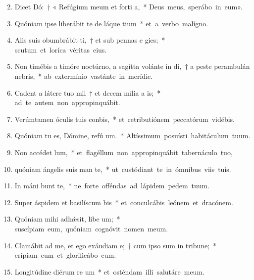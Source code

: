 \begin{flushleft}
\begin{enumerate}[leftmargin=*]
\setcounter{enumi}{1}
\item Dicet Dó:~† « Refúgium meum et forti a,~* \mbox{Deus meus, sperábo in eum».}

\item Quóniam ipse liberábit te de láque tium~* \mbox{et a verbo malígno.}

\item Alis suis obumbrábit ti,~† et sub pennas e gies;~* \mbox{scutum et loríca véritas eius.}

\item Non timébis a timóre noctúrno, a sagítta volánte in di,~† a peste perambulán  nebris,~* \mbox{ab extermínio vastánte in merídie.}

\item Cadent a látere tuo mil~† et decem mília a  is;~* \mbox{ad te autem non appropinquábit.}

\item Verúmtamen óculis tuis conbis,~* \mbox{et retributiónem peccatórum vidébis.}

\item Quóniam tu es, Dómine, refú um.~* \mbox{Altíssimum posuísti habitáculum tuum.}

\item Non accédet   lum,~* \mbox{et flagéllum non appropinquábit tabernáculo tuo,}

\item quóniam ángelis suis man  te,~* \mbox{ut custódiant te in ómnibus viis tuis.}

\item In máni bunt te,~* \mbox{ne forte offéndas ad lápidem pedem tuum.}

\item Super áspidem et basilíscum bis~* \mbox{et conculcábis leónem et dracónem.}

\item Quóniam mihi adhǽsit, libe um;~* \mbox{suscípiam eum, quóniam cognóvit nomen meum.}

\item Clamábit ad me, et ego exáudiam e;~† cum ipso sum in tribune;~* \mbox{erípiam eum et glorificábo eum.}

\item Longitúdine diérum re um~* \mbox{et osténdam illi salutáre meum.}
\end{enumerate}
\end{flushleft}
